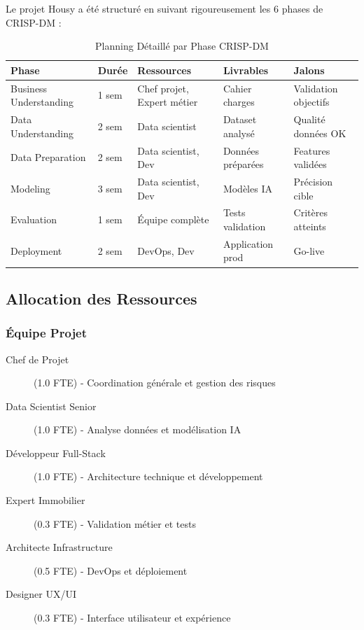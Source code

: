 Le projet Housy a été structuré en suivant rigoureusement les 6 phases de CRISP-DM :

\begin{table}[H]
\centering
\caption{Planning Détaillé par Phase CRISP-DM}
\begin{tabular}{|l|l|l|l|l|}
\hline
\textbf{Phase} & \textbf{Durée} & \textbf{Ressources} & \textbf{Livrables} & \textbf{Jalons} \\
\hline
Business Understanding & 1 sem & Chef projet, Expert métier & Cahier charges & Validation objectifs \\
\hline
Data Understanding & 2 sem & Data scientist & Dataset analysé & Qualité données OK \\
\hline
Data Preparation & 2 sem & Data scientist, Dev & Données préparées & Features validées \\
\hline
Modeling & 3 sem & Data scientist, Dev & Modèles IA & Précision cible \\
\hline
Evaluation & 1 sem & Équipe complète & Tests validation & Critères atteints \\
\hline
Deployment & 2 sem & DevOps, Dev & Application prod & Go-live \\
\hline
\end{tabular}
\label{tab:planning_crisp_dm}
\end{table}

\subsection{Allocation des Ressources}
\label{subsec:allocation_ressources}

\subsubsection{Équipe Projet}

\begin{description}
    \item[Chef de Projet] (1.0 FTE) - Coordination générale et gestion des risques
    \item[Data Scientist Senior] (1.0 FTE) - Analyse données et modélisation IA
    \item[Développeur Full-Stack] (1.0 FTE) - Architecture technique et développement
    \item[Expert Immobilier] (0.3 FTE) - Validation métier et tests
    \item[Architecte Infrastructure] (0.5 FTE) - DevOps et déploiement
    \item[Designer UX/UI] (0.3 FTE) - Interface utilisateur et expérience
\end{description}

